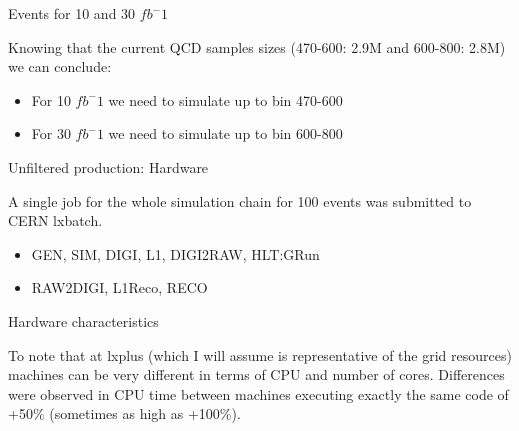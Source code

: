 \documentclass[8pt]{beamer}
\begin{document}
\begin{frame}{Events for 10 and 30 $fb^-1$}

\begin{block}



\end{block}
  
Knowing that the current QCD samples sizes (470-600: 2.9M and 600-800: 2.8M) we can conclude:
\begin{itemize}
  \item For 10 $fb^-1$ we need to simulate up to bin 470-600
  \item For 30 $fb^-1$ we need to simulate up to bin 600-800
\end{itemize}

\end{frame}


\begin{frame}{Unfiltered production: Hardware}

A single job for the whole simulation chain for 100 events was submitted to CERN lxbatch.
\begin{itemize}
  \item GEN, SIM, DIGI, L1, DIGI2RAW, HLT:GRun
  \item RAW2DIGI, L1Reco, RECO
\end{itemize}

\begin{block}{Hardware characteristics}
 


\end{block}

To note that at lxplus (which I will assume is representative of the grid resources) machines can be very different in terms of CPU and number of cores. Differences were observed in CPU time between machines executing exactly the same code of +50\% (sometimes as high as +100\%).

\end{frame}
\end{document}
